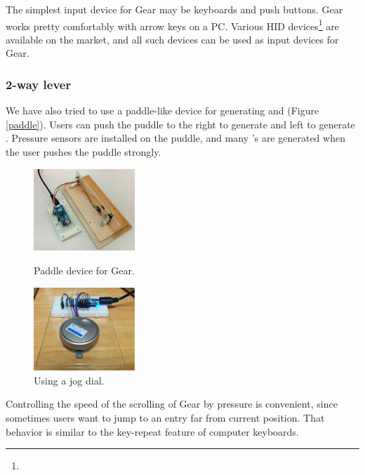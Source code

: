 \documentclass[conference]{IEEEtran}
\def\up{\tsf{▲}}
\def\down{\tsf{▼}}
\begin{document}
The simplest input device for Gear may be keyboards and push buttons.
Gear works pretty comfortably with arrow keys on a PC.
Various HID devices\footnote{
} are available on the market, and
all such devices can be used as input devices for Gear.

\subsubsection{2-way lever}

We have also tried to use a paddle-like device for generating {\up} and {\down} (Figure \ref{paddle}).
Users can push the puddle to the right to generate {\up} and
left to generate {\down}.
Pressure sensors are installed on the puddle, and
many {\up}'s are generated when the user pushes the puddle strongly.

\begin{figure}[H]
  \begin{minipage}{0.49\hsize}
    \centerline{\includegraphics[width=38mm,bb=0 0 514 418]{figures/3c2de63899653056f3c6be835b9aaf43.png}}
    \caption{Paddle device for Gear.}
    \label{paddle}
  \end{minipage}
  \begin{minipage}{0.49\hsize}
    \centerline{\includegraphics[width=38mm,bb=0 0 1324 1095]{figures/7a2c685b930cd30a267f4d564a8079be.png}}
    \caption{Using a jog dial.}
    \label{jog}
  \end{minipage}
\end{figure}

Controlling the speed of the scrolling of Gear by pressure is convenient,
since sometimes users want to jump to an entry far from current position.
That behavior is similar to the key-repeat feature of computer keyboards.
\end{document}
